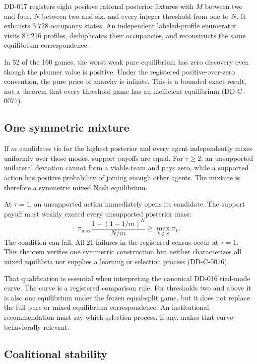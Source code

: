 \documentclass[11pt]{article}
\begin{document}
DD-017 registers eight positive rational posterior fixtures with $M$ between
two and four, $N$ between two and six, and every integer threshold from one to
$N$. It exhausts 3,728 occupancy states. An independent labeled-profile
enumerator visits 87,216 profiles, deduplicates their occupancies, and
reconstructs the same equilibrium correspondence.



In 52 of the 160 games, the worst weak pure equilibrium has zero discovery even
though the planner value is positive. Under the registered positive-over-zero
convention, the pure price of anarchy is infinite. This is a bounded exact
result, not a theorem that every threshold game has an inefficient equilibrium
(DD-C-0077).

\subsection{One symmetric mixture}

If $m$ candidates tie for the highest posterior and every agent independently
mixes uniformly over those modes, support payoffs are equal. For $\tau\geq2$,
an unsupported unilateral deviation cannot form a viable team and pays zero,
while a supported action has positive probability of joining enough other
agents. The mixture is therefore a symmetric mixed Nash equilibrium.

At $\tau=1$, an unsupported action immediately opens its candidate. The support
payoff must weakly exceed every unsupported posterior mass:
\begin{equation}
 \pi_{\max}\frac{1-(1-1/m)^N}{N/m}\geq \max_{k\notin S}\pi_k.
 \label{eq:mixed-boundary}
\end{equation}
The condition can fail. All 21 failures in the registered census occur at
$\tau=1$. This theorem verifies one symmetric construction but neither
characterizes all mixed equilibria nor supplies a learning or selection
process (DD-C-0076).

That qualification is essential when interpreting the canonical DD-016
tied-mode curve. The curve is a registered comparison rule. For thresholds two
and above it is also one equilibrium under the frozen equal-split game, but it
does not replace the full pure or mixed equilibrium correspondence. An
institutional recommendation must say which selection process, if any, makes
that curve behaviorally relevant.

\subsection{Coalitional stability}
\end{document}
